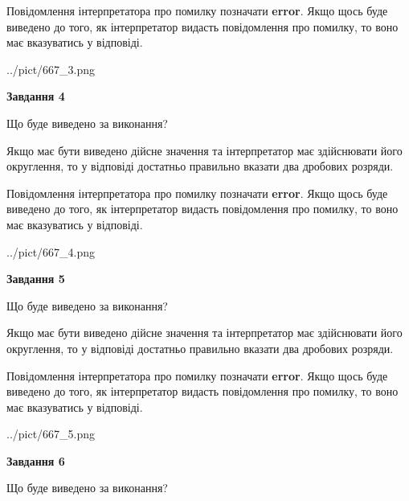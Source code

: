 \documentclass[12pt, ukrainian]{article}
\begin{document}
{\begin {Large}
Повідомлення інтерпретатора про помилку позначати \textbf{error}.
Якщо щось буде виведено до того, як інтерпретатор видасть повідомлення про помилку, 
то воно має вказуватись у відповіді. \par

\begin{center}
	{../pict/667_3.png}
\end{center}
\newpage

{\begin {center}\textbf{Завдання 4}\end {center}}\par
Що буде виведено за виконання? \par

Якщо має бути виведено дійсне значення та інтерпретатор має здійснювати його округлення, 
то у відповіді достатньо правильно вказати два дробових розряди.

Повідомлення інтерпретатора про помилку позначати \textbf{error}.
Якщо щось буде виведено до того, як інтерпретатор видасть повідомлення про помилку, 
то воно має вказуватись у відповіді. \par

\begin{center}
	{../pict/667_4.png}
\end{center}
\newpage

{\begin {center}\textbf{Завдання 5}\end {center}}\par
Що буде виведено за виконання? \par

Якщо має бути виведено дійсне значення та інтерпретатор має здійснювати його округлення, 
то у відповіді достатньо правильно вказати два дробових розряди.

Повідомлення інтерпретатора про помилку позначати \textbf{error}.
Якщо щось буде виведено до того, як інтерпретатор видасть повідомлення про помилку, 
то воно має вказуватись у відповіді. \par

\begin{center}
	{../pict/667_5.png}
\end{center}
\newpage

{\begin {center}\textbf{Завдання 6}\end {center}}\par
Що буде виведено за виконання? \par


\end{Large}}
\end{document}
